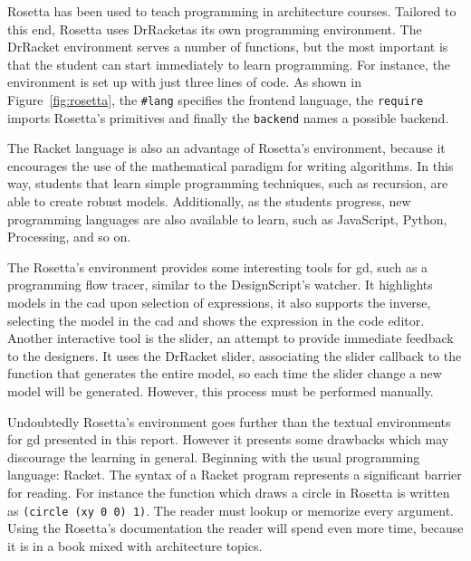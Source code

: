 Rosetta has been used to teach programming in architecture courses. Tailored to this end, Rosetta uses DrRacketas its own programming environment. The DrRacket environment serves a number of functions, but the most important is that the student can start immediately to learn programming. For instance, the environment is set up with just three lines of code. As shown in Figure~\ref{fig:rosetta}, the \texttt{\#lang} specifies the frontend language, the \texttt{require} imports Rosetta's primitives and finally the \texttt{backend} names a possible backend.

The Racket language is also an advantage of Rosetta's environment, because it encourages the use of the mathematical paradigm for writing algorithms. In this way, students that learn simple programming techniques, such as recursion, are able to create robust models. Additionally, as the students progress, new programming languages are also available to learn, such as JavaScript, Python, Processing, and so on.

The Rosetta's environment provides some interesting tools for \gls{gd}, such as a programming flow tracer, similar to the DesignScript's watcher. It highlights models in the \gls{cad} upon selection of expressions, it also supports the inverse, selecting the model in the \gls{cad} and shows the expression in the code editor. Another interactive tool is the slider, an attempt to provide immediate feedback to the designers. It uses the DrRacket slider, associating the slider callback to the function that generates the entire model, so each time the slider change a new model will be generated. However, this process must be performed manually.

Undoubtedly Rosetta's environment goes further than the textual environments for \gls{gd} presented in this report. However it presents some drawbacks which may discourage the learning in general. Beginning with the usual programming language: Racket. The syntax of a Racket program represents a significant barrier for reading. For instance the function which draws a circle in Rosetta is written as \texttt{(circle (xy 0 0) 1)}. The reader must lookup or memorize every argument. Using the Rosetta's documentation the reader will spend even more time, because it is in a book mixed with architecture topics.
